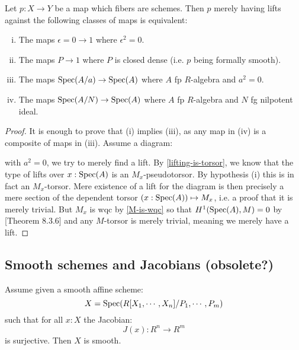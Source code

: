 \begin{proposition}
Let $p:X\to Y$ be a map which fibers are schemes. Then $p$ merely having lifts against the following classes of maps is equivalent:
\begin{enumerate}[(i)]
\item The maps $\epsilon=0\to 1$ where $\epsilon^2=0$.
\item The maps $P\to 1$ where $P$ is closed dense (i.e. $p$ being formally smooth).
\item The maps $\operatorname{Spec}(A/a)\to \operatorname{Spec}(A)$ where $A$ fp $R$-algebra and $a^2=0$.
\item The maps $\operatorname{Spec}(A/N)\to \operatorname{Spec}(A)$ where $A$ fp $R$-algebra and $N$ fg nilpotent ideal.
\end{enumerate}
\end{proposition}

\begin{proof}
It is enough to prove that (i) implies (iii), as any map in (iv) is a composite of maps in (iii). Assume a diagram:
 \begin{center}
    \end{center} 
    with $a^2=0$, we try to merely find a lift. By \cref{lifting-is-torsor}, we know that the type of lifts over $x:\operatorname{Spec}(A)$ is an $M_x$-pseudotorsor. By hypothesis (i) this is in fact an $M_x$-torsor. Mere existence of a lift for the diagram is then precisely a mere section of the dependent torsor $(x:\operatorname{Spec}(A))\mapsto M_x$, i.e. a proof that it is merely trivial. But $M_x$ is wqc by \cref{M-is-wqc} so that $H^1(\operatorname{Spec}(A),M)=0$ by \cite{draft}[Theorem 8.3.6] and any $M$-torsor is merely trivial, meaning we merely have a lift.
\end{proof}

\subsection{Smooth schemes and Jacobians (obsolete?)}

\begin{lemma}
Assume given a smooth affine scheme:
\[X = \operatorname{Spec}(R[X_1,\cdots,X_n]/P_1,\cdots,P_m)\]
such that for all $x:X$ the Jacobian:
\[J(x) : R^n \to R^m\]
is surjective. Then $X$ is smooth.
\end{lemma}

